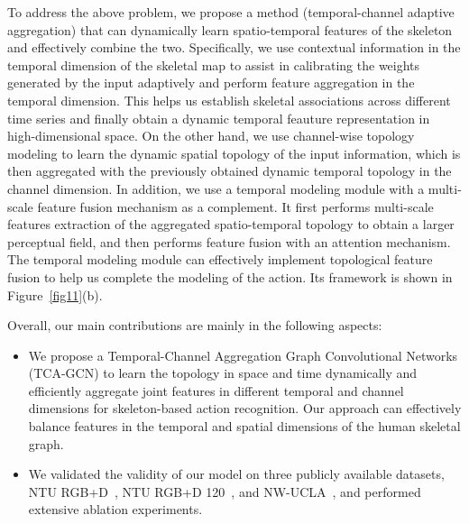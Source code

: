 \documentclass[letterpaper]{article} \usepackage[submission]{aaai23}  \usepackage{times}  \usepackage{helvet}  \usepackage{courier}  \usepackage[hyphens]{url}  \usepackage{graphicx} \urlstyle{rm} \def\UrlFont{\rm}  \usepackage{natbib}  \usepackage{caption} \frenchspacing  \setlength{\pdfpagewidth}{8.5in} \setlength{\pdfpageheight}{11in} \usepackage{algorithm}
\begin{document}
To address the above problem, we propose a method (temporal-channel adaptive aggregation) that can dynamically learn spatio-temporal features of the skeleton and effectively combine the two. Specifically, we use contextual information in the temporal dimension of the skeletal map to assist in calibrating the weights generated by the input adaptively and perform feature aggregation in the temporal dimension. This helps us establish skeletal associations across different time series and finally obtain a dynamic temporal feauture representation in high-dimensional space. On the other hand, we use channel-wise topology modeling to learn the dynamic spatial topology of the input information, which is then aggregated with the previously obtained dynamic temporal topology in the channel dimension. In addition, we use a temporal modeling module with a multi-scale feature fusion mechanism as a complement. It first performs multi-scale features extraction of the aggregated spatio-temporal topology to obtain a larger perceptual field, and then performs feature fusion with an attention mechanism. The temporal modeling module can effectively implement topological feature fusion to help us complete the modeling of the action. Its framework is shown in Figure~\ref{fig11}(b).



Overall, our main contributions are mainly in the following aspects:

\begin{itemize}
    \item  We propose a Temporal-Channel Aggregation Graph Convolutional Networks (TCA-GCN) to learn the topology in space and time dynamically and efficiently aggregate joint features in different temporal and channel dimensions for skeleton-based action recognition. Our approach can effectively balance features in the temporal and spatial dimensions of the human skeletal graph.
    \item We validated the validity of our model on three publicly available datasets, NTU RGB+D~\cite{2016NTU}, NTU RGB+D 120~\cite{2020NTU}, and NW-UCLA~\cite{DBLP:journals/corr/WangNXWZ14}, and performed extensive ablation experiments.
\end{itemize}
\end{document}
